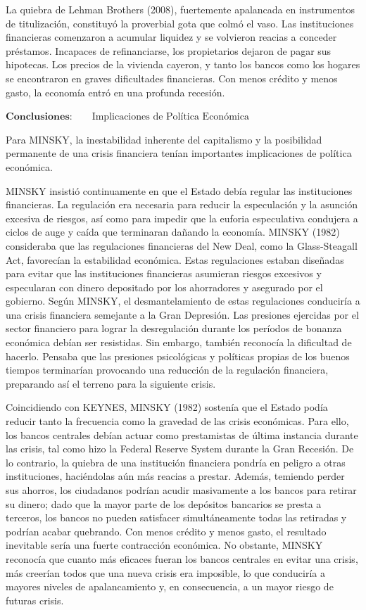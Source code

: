 \documentclass[10pt,a4paper]{article}
\begin{document}
La quiebra de Lehman Brothers (2008), fuertemente apalancada en instrumentos de titulización, constituyó la proverbial gota que colmó el vaso. Las instituciones financieras comenzaron a acumular liquidez y se volvieron reacias a conceder préstamos. Incapaces de refinanciarse, los propietarios dejaron de pagar sus hipotecas. Los precios de la vivienda cayeron, y tanto los bancos como los hogares se encontraron en graves dificultades financieras. Con menos crédito y menos gasto, la economía entró en una profunda recesión.

$\textbf{Conclusiones}:\qquad \text{Implicaciones de Política Económica}$

Para MINSKY, la inestabilidad inherente del capitalismo y la posibilidad permanente de una crisis financiera tenían importantes implicaciones de política económica.

MINSKY insistió continuamente en que el Estado debía regular las instituciones financieras. La regulación era necesaria para reducir la especulación y la asunción excesiva de riesgos, así como para impedir que la euforia especulativa condujera a ciclos de auge y caída que terminaran dañando la economía. MINSKY (1982) consideraba que las regulaciones financieras del New Deal, como la Glass-Steagall Act, favorecían la estabilidad económica. Estas regulaciones estaban diseñadas para evitar que las instituciones financieras asumieran riesgos excesivos y especularan con dinero depositado por los ahorradores y asegurado por el gobierno. Según MINSKY, el desmantelamiento de estas regulaciones conduciría a una crisis financiera semejante a la Gran Depresión. Las presiones ejercidas por el sector financiero para lograr la desregulación durante los períodos de bonanza económica debían ser resistidas. Sin embargo, también reconocía la dificultad de hacerlo. Pensaba que las presiones psicológicas y políticas propias de los buenos tiempos terminarían provocando una reducción de la regulación financiera, preparando así el terreno para la siguiente crisis.

Coincidiendo con KEYNES, MINSKY (1982) sostenía que el Estado podía reducir tanto la frecuencia como la gravedad de las crisis económicas. Para ello, los bancos centrales debían actuar como prestamistas de última instancia durante las crisis, tal como hizo la Federal Reserve System durante la Gran Recesión. De lo contrario, la quiebra de una institución financiera pondría en peligro a otras instituciones, haciéndolas aún más reacias a prestar. Además, temiendo perder sus ahorros, los ciudadanos podrían acudir masivamente a los bancos para retirar su dinero; dado que la mayor parte de los depósitos bancarios se presta a terceros, los bancos no pueden satisfacer simultáneamente todas las retiradas y podrían acabar quebrando. Con menos crédito y menos gasto, el resultado inevitable sería una fuerte contracción económica. No obstante, MINSKY reconocía que cuanto más eficaces fueran los bancos centrales en evitar una crisis, más creerían todos que una nueva crisis era imposible, lo que conduciría a mayores niveles de apalancamiento y, en consecuencia, a un mayor riesgo de futuras crisis.
\end{document}
